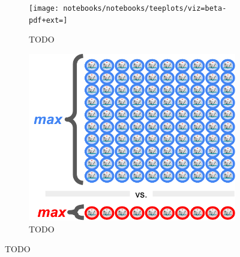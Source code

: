 \begin{figure}
  \centering
  \begin{subfigure}[b]{0.5\textwidth}
    \centering
    \texttt{[image: notebooks/notebooks/teeplots/viz=beta-pdf+ext=]}
    \caption{TODO}
    \label{fig:TODO}
  \end{subfigure}%
  \begin{subfigure}[b]{0.5\textwidth}
    \centering
    \includegraphics[width=\textwidth]{img/dice-pool}
    \caption{TODO}
    \label{fig:TODO}
  \end{subfigure}
  \caption{TODO}
  \label{fig:beta-explain}
\end{figure}
